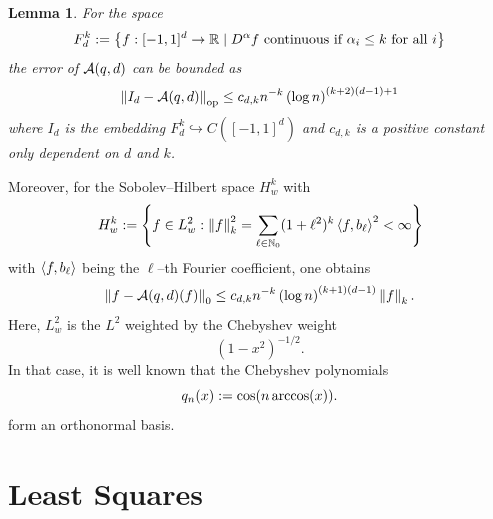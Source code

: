 \documentclass[12pt, oneside]{amsart}
\newtheorem{lem}[thm]{Lemma}
\theoremstyle{definition}
\theoremstyle{remark}
\numberwithin{equation}{section}
\begin{document}
\begin{lem}
	For the space
	\[
		F_d^k \defn \set{f: [-1, 1]^d \to \R \mid D^\alpha f \text{ continuous if } \alpha_i \leq k \text{ for all } i}
	\]
	the error of \(\cA(q, d)\) can be bounded as \[
		\norm[\op]{I_d - \cA(q, d)} \leq c_{d,k} n^{-k} \left(\log n\right)^{(k+2)(d-1)+1}
	\]
	where \(I_d\) is the embedding \(F_d^k \hookrightarrow C([-1, 1]^d)\) and \(c_{d, k}\) is a positive constant only dependent on \(d\) and \(k\).
\end{lem}

Moreover, for the Sobolev--Hilbert space \(H_w^k\) with \begin{equation}
	H_w^k \defn \set{f \in L^2_w : \norm[k]{f}^2 = \sum_{\ell \in \N_0} (1+\ell^2)^k \inner{f}{b_\ell}^2 < \infty}
\end{equation}
with \(\inner{f}{b_\ell}\) being the \(\ell\)--th Fourier coefficient, one obtains \[
	\norm[0]{f-\cA(q, d)(f)} \leq c_{d, k} n^{-k} \left(\log n\right)^{(k+1)(d-1)}\norm[k]{f}.
\]
Here, \(L^2_w\) is the \(L^2\) weighted by the Chebyshev weight \begin{equation}\label{chebyshev_weight}
	\left(1-x^2\right)^{-1/2}.
\end{equation}
In that case, it is well known that the Chebyshev polynomials
\begin{equation}\label{chebyshev_polynomials}
	q_n(x) \defn \cos(n \arccos(x)).
\end{equation}
form an orthonormal basis.
\newpage
\section{Least Squares}
\end{document}
